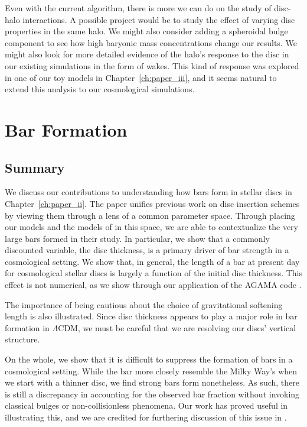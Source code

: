 Even with the current algorithm, there is more we can do on the study of disc-halo interactions. A possible project would be to study the effect of varying disc properties in the same halo. We might also consider adding a spheroidal bulge component to see how high baryonic mass concentrations change our results. We might also look for more detailed evidence of the halo's response to the disc in our existing simulations in the form of wakes. This kind of response was explored in one of our toy models in Chapter~\ref{ch:paper_iii}, and it seems natural to extend this analysis to our cosmological simulations.


\section{Bar Formation}
\subsection{Summary}

We discuss our contributions to understanding how bars form in stellar discs in Chapter~\ref{ch:paper_ii}. The paper unifies previous work on disc insertion schemes by viewing them through a lens of a common parameter space. Through placing our models and the models of \citet{YurinSpringelStellarDisks} in this space, we are able to contextualize the very large bars formed in their study. In particular, we show that a commonly discounted variable, the disc thickness, is a primary driver of bar strength in a cosmological setting. We show that, in general, the length of a bar at present day for cosmological stellar discs is largely a function of the initial disc thickness. This effect is not numerical, as we show through our application of the \textsc{AGAMA} code \citep{vasiliev_2018}. 

The importance of being cautious about the choice of gravitational softening length is also illustrated. Since disc thickness appears to play a major role in bar formation in $\Lambda$CDM, we must be careful that we are resolving our discs' vertical structure.


On the whole, we show that it is difficult to suppress the formation of bars in a cosmological setting. While the bar more closely resemble the Milky Way's when we start with a thinner disc, we find strong bars form nonetheless. As such, there is still a discrepancy in accounting for the observed bar fraction without invoking classical bulges or non-collisionless phenomena. Our work has proved useful in illustrating this, and we are credited for furthering discussion of this issue in \citet{sellwood_2019}.


